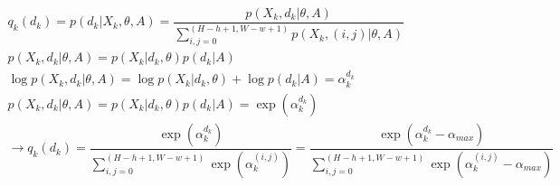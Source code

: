 \begin{gather*}
	q_k(d_k) = p(d_k | X_k, \theta, A) = \dfrac{p(X_k, d_k | \theta, A)}{\sum_{i, j = 0}^{(H-h+1, W-w+1)} p(X_k, (i, j) | \theta, A)} \\
	p(X_k, d_k | \theta, A) = p(X_k | d_k, \theta) p(d_k| A) \\
	\log p(X_k, d_k | \theta, A) = \log p(X_k | d_k, \theta) + \log p(d_k| A) = \alpha_{k}^{d_k}\\
	p(X_k, d_k | \theta, A) = p(X_k | d_k, \theta) p(d_k| A) = \exp(\alpha_{k}^{d_k})\\
	\rightarrow q_k(d_k) = \dfrac{\exp(\alpha_{k}^{d_k})}{\sum_{i, j = 0}^{(H-h+1, W-w+1)} \exp(\alpha_{k}^{(i, j)})} = \dfrac{\exp(\alpha_{k}^{d_k} - \alpha_{max})}{\sum_{i, j = 0}^{(H-h+1, W-w+1)} \exp(\alpha_{k}^{(i, j)} - \alpha_{max})}
\end{gather*}